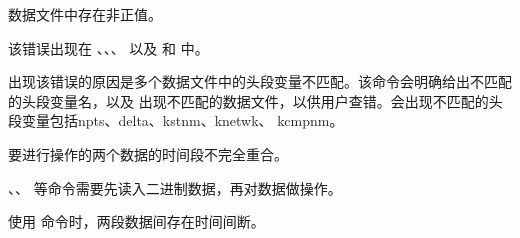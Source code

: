 数据文件中存在非正值。

该错误出现在 、、、
以及  和  中。

出现该错误的原因是多个数据文件中的头段变量不匹配。该命令会明确给出不匹配的头段变量名，以及
出现不匹配的数据文件，以供用户查错。会出现不匹配的头段变量包括npts、delta、kstnm、knetwk、
kcmpnm。

要进行操作的两个数据的时间段不完全重合。

、、 等命令需要先读入二进制数据，再对数据做操作。

使用  命令时，两段数据间存在时间间断。
